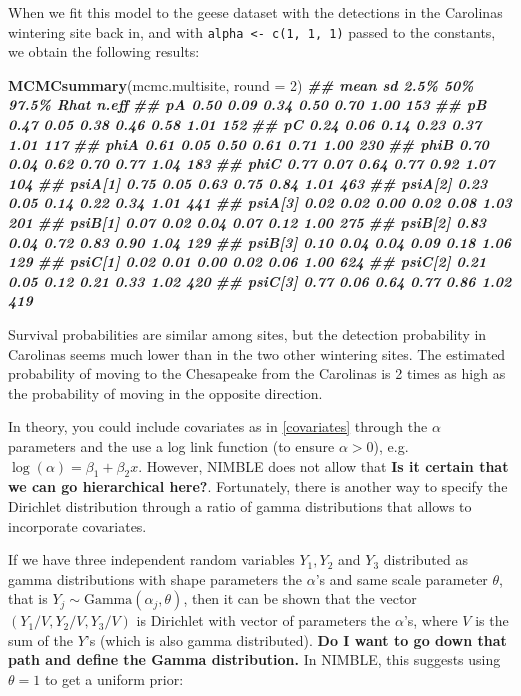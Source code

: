 \documentclass[
  12pt,
]{krantz}
\newenvironment{Shaded}{\begin{snugshade}}{\end{snugshade}}
\newcommand{\AttributeTok}[1]{\textcolor[rgb]{0.13,0.29,0.53}{#1}}
\newcommand{\DecValTok}[1]{\textcolor[rgb]{0.00,0.00,0.81}{#1}}
\newcommand{\DocumentationTok}[1]{\textcolor[rgb]{0.56,0.35,0.01}{\textbf{\textit{#1}}}}
\newcommand{\FunctionTok}[1]{\textcolor[rgb]{0.13,0.29,0.53}{\textbf{#1}}}
\newcommand{\NormalTok}[1]{#1}
\begin{document}
When we fit this model to the geese dataset with the detections in the Carolinas wintering site back in, and with \texttt{alpha\ \textless{}-\ c(1,\ 1,\ 1)} passed to the constants, we obtain the following results:

\begin{Shaded}
\begin{Highlighting}[]
\FunctionTok{MCMCsummary}\NormalTok{(mcmc.multisite, }\AttributeTok{round =} \DecValTok{2}\NormalTok{)}
\DocumentationTok{\#\#         mean   sd 2.5\%  50\% 97.5\% Rhat n.eff}
\DocumentationTok{\#\# pA      0.50 0.09 0.34 0.50  0.70 1.00   153}
\DocumentationTok{\#\# pB      0.47 0.05 0.38 0.46  0.58 1.01   152}
\DocumentationTok{\#\# pC      0.24 0.06 0.14 0.23  0.37 1.01   117}
\DocumentationTok{\#\# phiA    0.61 0.05 0.50 0.61  0.71 1.00   230}
\DocumentationTok{\#\# phiB    0.70 0.04 0.62 0.70  0.77 1.04   183}
\DocumentationTok{\#\# phiC    0.77 0.07 0.64 0.77  0.92 1.07   104}
\DocumentationTok{\#\# psiA[1] 0.75 0.05 0.63 0.75  0.84 1.01   463}
\DocumentationTok{\#\# psiA[2] 0.23 0.05 0.14 0.22  0.34 1.01   441}
\DocumentationTok{\#\# psiA[3] 0.02 0.02 0.00 0.02  0.08 1.03   201}
\DocumentationTok{\#\# psiB[1] 0.07 0.02 0.04 0.07  0.12 1.00   275}
\DocumentationTok{\#\# psiB[2] 0.83 0.04 0.72 0.83  0.90 1.04   129}
\DocumentationTok{\#\# psiB[3] 0.10 0.04 0.04 0.09  0.18 1.06   129}
\DocumentationTok{\#\# psiC[1] 0.02 0.01 0.00 0.02  0.06 1.00   624}
\DocumentationTok{\#\# psiC[2] 0.21 0.05 0.12 0.21  0.33 1.02   420}
\DocumentationTok{\#\# psiC[3] 0.77 0.06 0.64 0.77  0.86 1.02   419}
\end{Highlighting}
\end{Shaded}

Survival probabilities are similar among sites, but the detection probability in Carolinas seems much lower than in the two other wintering sites. The estimated probability of moving to the Chesapeake from the Carolinas is 2 times as high as the probability of moving in the opposite direction.

In theory, you could include covariates as in \ref{covariates} through the \(\alpha\) parameters and the use a log link function (to ensure \(\alpha > 0\)), e.g.~\(\log(\alpha) = \beta_1 + \beta_2 x\). However, NIMBLE does not allow that \textbf{Is it certain that we can go hierarchical here?}. Fortunately, there is another way to specify the Dirichlet distribution through a ratio of gamma distributions that allows to incorporate covariates.

If we have three independent random variables \(Y_1, Y_2\) and \(Y_3\) distributed as gamma distributions with shape parameters the \(\alpha\)'s and same scale parameter \(\theta\), that is \(Y_j \sim \text{Gamma}(\alpha_j, \theta)\), then it can be shown that the vector \((Y_1/V, Y_2/V, Y_3/V)\) is Dirichlet with vector of parameters the \(\alpha\)'s, where \(V\) is the sum of the \(Y\)'s (which is also gamma distributed). \textbf{Do I want to go down that path and define the Gamma distribution.} In NIMBLE, this suggests using \(\theta = 1\) to get a uniform prior:
\end{document}
